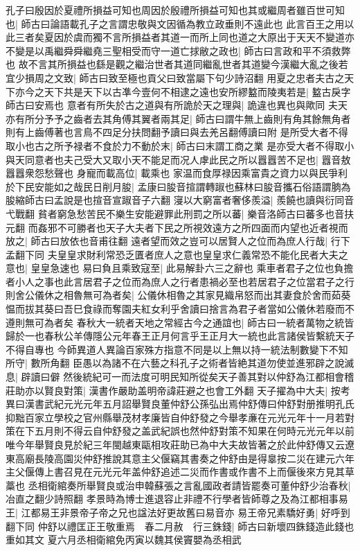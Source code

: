 孔子曰殷因於夏禮所損益可知也周因於殷禮所損益可知也其或繼周者雖百世可知也|{
	師古曰論語載孔子之言謂忠敬與文因循為教立政垂則不遠此也}
此言百王之用以此三者矣夏因於虞而獨不言所損益者其道一而所上同也道之大原出于天天不變道亦不變是以禹繼舜舜繼堯三聖相受而守一道亡捄敝之政也|{
	師古曰言政和平不須救弊也}
故不言其所損益也繇是觀之繼治世者其道同繼亂世者其道變今漢繼大亂之後若宜少損周之文致|{
	師古曰致至極也貢父曰致當屬下句少詩沼翻}
用夏之忠者夫古之天下亦今之天下共是天下以古凖今壹何不相逮之遠也安所繆盭而陵夷若是|{
	盭古戾字師古曰安焉也}
意者有所失於古之道與有所詭於天之理與|{
	詭違也異也與歟同}
夫天亦有所分予予之齒者去其角傅其翼者兩其足|{
	師古曰謂牛無上齒則有角其餘無角者則有上齒傅著也言鳥不四足分扶問翻予讀曰與去羌呂翻傅讀曰附}
是所受大者不得取小也古之所予禄者不食於力不動於末|{
	師古曰末謂工商之業}
是亦受大者不得取小與天同意者也夫己受大又取小天不能足而况人虖此民之所以囂囂苦不足也|{
	囂音敖囂囂衆怨愁聲也}
身寵而載高位|{
	載乘也}
家温而食厚禄因乘富貴之資力以與民爭利於下民安能如之哉民日削月朘|{
	孟康曰朘音揎謂轉踧也蘇林曰朘音攜石俗語謂朒為朘縮師古曰孟說是也揎音宣踧音子六翻}
寖以大窮富者奢侈羨溢|{
	羨饒也讀與衍同音弋戰翻}
貧者窮急愁苦民不樂生安能避罪此刑罰之所以蕃|{
	樂音洛師古曰蕃多也音扶元翻}
而姦邪不可勝者也天子大夫者下民之所視效遠方之所四面而内望也近者視而放之|{
	師古曰放依也音甫往翻}
遠者望而效之豈可以居賢人之位而為庶人行哉|{
	行下孟翻下同}
夫皇皇求財利常恐乏匱者庶人之意也皇皇求仁義常恐不能化民者大夫之意也|{
	皇皇急速也}
易曰負且乘致寇至|{
	此易解卦六三之辭也}
乘車者君子之位也負擔者小人之事也此言居君子之位而為庶人之行者患禍必至也若居君子之位當君子之行則舍公儀休之相魯無可為者矣|{
	公儀休相魯之其家見織帛怒而出其妻食於舍而茹葵愠而拔其葵曰吾巳食祿而奪園夫紅女利乎舍讀曰捨言為君子者當如公儀休若廢而不遵則無可為者矣}
春秋大一統者天地之常經古今之通誼也|{
	師古曰一統者萬物之統皆歸於一也春秋公羊傳隱公元年春王正月何言乎王正月大一統也此言諸侯皆繫統天子不得自專也}
今師異道人異論百家殊方指意不同是以上無以持一統法制數變下不知所守|{
	數所角翻}
臣愚以為諸不在六藝之科孔子之術者皆絶其道勿使並進邪辟之說滅息|{
	辟讀曰僻}
然後統紀可一而法度可明民知所從矣天子善其對以仲舒為江都相會稽莊助亦以賢良對策|{
	漢書作嚴助盖明帝諱莊避之也會工外翻}
天子擢為中大夫|{
	按考異曰漢書武紀元光元年五月詔舉賢良董仲舒公孫弘出焉仲舒傳曰仲舒對册推明孔氏抑黜百家立學校之官州縣舉茂材孝廉皆自仲舒發之今舉孝亷在元光元年十一月若對策在下五月則不得云自仲舒發之盖武紀誤也然仲舒對策不知果在何時元光元年以前唯今年舉賢良見於紀三年閩越東甌相攻莊助已為中大夫故皆著之於此仲舒傳又云遼東高廟長陵高園災仲舒推說其意主父偃竊其書奏之仲舒由是得辠按二災在建元六年主父偃傳上書召見在元光元年盖仲舒追述二災而作書或作書不上而偃後來方見其草藁也}
丞相衛綰奏所舉賢良或治申韓蘇張之言亂國政者請皆罷奏可董仲舒少治春秋|{
	冶直之翻少詩照翻}
孝景時為博士進退容止非禮不行學者皆師尊之及為江都相事易王|{
	江都易王非景帝子帝之兄也諡法好更故舊曰易音亦}
易王帝兄素驕好勇|{
	好呼到翻下同}
仲舒以禮匡正王敬重焉　春二月赦　行三銖錢|{
	師古曰新壞四銖錢造此錢也重如其文}
夏六月丞相衛綰免丙寅以魏其侯竇嬰為丞相武


